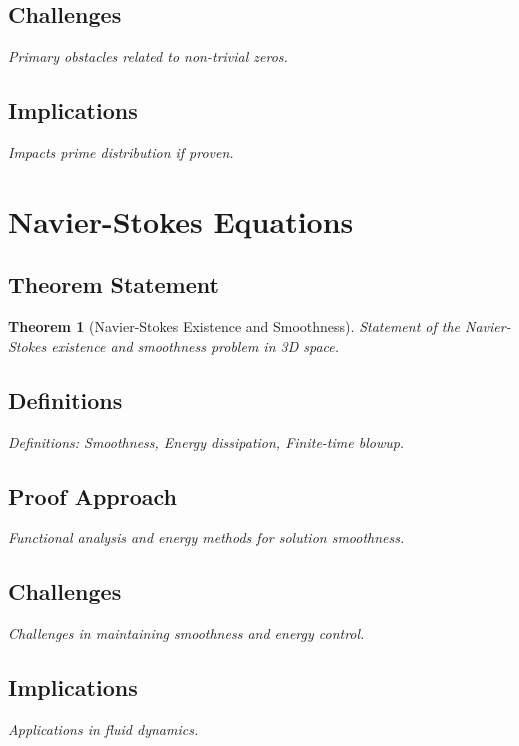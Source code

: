 \documentclass[12pt, a4paper]{article}
\newtheorem{theorem}{Theorem}[section]
\begin{document}
\subsection{Challenges}
\textit{Primary obstacles related to non-trivial zeros.}

\subsection{Implications}
\textit{Impacts prime distribution if proven.}


\section{Navier-Stokes Equations}
\subsection{Theorem Statement}
\begin{theorem}[Navier-Stokes Existence and Smoothness]
\label{thm:navier_stokes}
\textit{Statement of the Navier-Stokes existence and smoothness problem in 3D space.}
\end{theorem}

\subsection{Definitions}
\textit{Definitions: Smoothness, Energy dissipation, Finite-time blowup.}

\subsection{Proof Approach}
\textit{Functional analysis and energy methods for solution smoothness.}

\subsection{Challenges}
\textit{Challenges in maintaining smoothness and energy control.}

\subsection{Implications}
\textit{Applications in fluid dynamics.}
\end{document}
